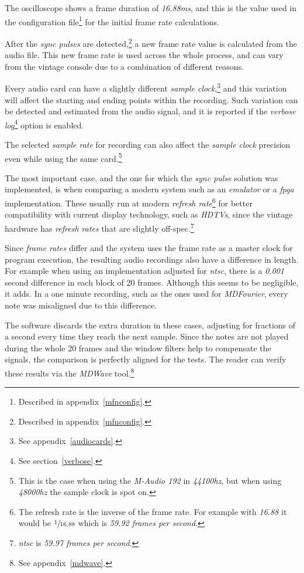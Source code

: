 \documentclass[10pt,a4paper]{report}
\newcommand{\ac}[1]{\textit{\mbox{\acrshort{#1}}}}
\newcommand{\hz}[1]{\textit{\mbox{#1\acrshort{hz}}}}
\begin{document}
\begin{appendices}
The oscilloscope shows a frame duration of \textit{16.88}\ac{ms}, and this is the value used in the configuration file\footnote{Described in appendix~\ref{mfnconfig}.} for the initial frame rate calculations.

After the \textit{sync pulses} are detected,\footnote{Described in appendix~\ref{mfnconfig}.} a new frame rate value is calculated from the audio file. This new frame rate is used across the whole process, and can vary from the vintage console due to a combination of different reasons.

Every audio card can have a slightly different \textit{sample clock},\footnote{See appendix~\ref{audiocards}.} and this variation will affect the starting and ending points within the recording. Such variation can be detected and estimated from the audio signal, and it is reported if the \textit{verbose log}\footnote{See section~\ref{verbose}.} option is enabled.

The selected \textit{sample rate} for recording can also affect the \textit{sample clock} precision even while using the same card.\footnote{This is the case when using the \textit{M-Audio 192} \cite{maudio} in \hz{44100}, but when using \hz{48000} the sample clock is spot on.}

The most important case, and the one for which the \textit{sync pulse} solution was implemented, is when comparing a modern system such as an \textit{emulator} or a \ac{fpga} implementation. These usually run at modern \textit{refresh rate}\footnote{The refresh rate is the inverse of the frame rate. For example with \textit{16.88} it would be $\sfrac{1}{16.88}$ which is \textit{59.92 frames per second}.} for better compatibility with current display technology, such as \textit{HDTVs}, since the vintage hardware has \textit{refresh rates} that are slightly off-spec.\footnote{\ac{ntsc} is \textit{59.97 frames per second}.}

Since \textit{frame rates} differ and the system uses the frame rate as a master clock for program execution, the resulting audio recordings also have a difference in length. For example when using an implementation adjusted for \ac{ntsc}, there is a \textit{0.001} second difference in each block of 20 frames. Although this seems to be negligible, it adds. In a one minute recording, such as the ones used for \textit{MDFourier}, every note was misaligned due to this difference.

The software discards the extra duration in these cases, adjusting for fractions of a second every time they reach the next sample. Since the notes are not played during the whole 20 frames and the window filters help to compensate the signals, the comparison is perfectly aligned for the tests. The reader can verify these results via the \textit{MDWave} tool.\footnote{See appendix~\ref{mdwave}.}


\end{appendices}
\end{document}
